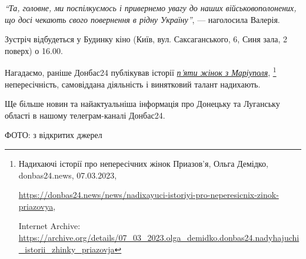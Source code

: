 \begin{leftbar}
\emph{\enquote{Та, головне, ми поспілкуємось і привернемо увагу до наших
військовополонених, що досі чекають свого повернення в рідну Україну}}, —
наголосила Валерія.
\end{leftbar}

Зустріч відбудеться у Будинку кіно (Київ, вул. Саксаганського, 6, Синя зала, 2
поверх) о 16.00.

Нагадаємо, раніше Донбас24 публікував історії \href{https://archive.org/details/07_03_2023.olga_demidko.donbas24.nadyhajuchi_istorii_zhinky_priazovja}{\emph{п'яти жінок з Маріуполя}},%
\footnote{Надихаючі історії про непересічних жінок Приазов'я, Ольга Демідко, donbas24.news, 07.03.2023, %
\par\url{https://donbas24.news/news/nadixayuci-istoriyi-pro-neperesicnix-zinok-priazovya}, \par%
Internet Archive: \url{https://archive.org/details/07_03_2023.olga_demidko.donbas24.nadyhajuchi_istorii_zhinky_priazovja}%
} непересічність, самовіддана діяльність і винятковий талант надихають.

Ще більше новин та найактуальніша інформація про Донецьку та Луганську області
в нашому телеграм-каналі Донбас24.

ФОТО: з відкритих джерел

